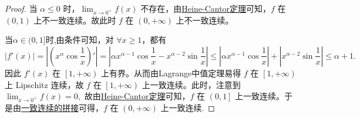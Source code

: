 \documentclass[../../main.tex]{subfiles}%
\begin{document}
\begin{proof}
当 $\alpha \leqslant 0$ 时，$\lim_{x \rightarrow 0^+} f\left( x \right)$ 不存在，由\hyperref[theroem:Heine-Cantor定理]{Heine-Cantor定理}可知，$f$ 在 $\left( 0,1 \right)$ 上不一致连续。故此时 $f$ 在 $\left( 0,+\infty \right)$ 上不一致连续。

当$\alpha \in (0,1]$时,由条件可知，对 $\forall x \geqslant 1$，都有
\[
\left| f'\left( x \right) \right| = \left| \left( x^{\alpha} \cos \frac{1}{x} \right)' \right| = \left| \alpha x^{\alpha - 1} \cos \frac{1}{x} - x^{\alpha - 2} \sin \frac{1}{x} \right| \leqslant \left| \alpha x^{\alpha - 1} \cos \frac{1}{x} \right| + \left| x^{\alpha - 2} \sin \frac{1}{x} \right| \leqslant \alpha + 1.
\]
因此 $f'\left( x \right)$ 在 $\left[ 1, +\infty \right)$ 上有界。从而由Lagrange中值定理易得 $f$ 在 $\left[ 1,+\infty \right)$ 上 Lipschitz 连续，故 $f$ 在 $\left[ 1,+\infty \right)$ 上一致连续。此时，注意到
\(
\lim_{x \rightarrow 0^+} f\left( x \right) = 0,
\)
故由\hyperref[theroem:Heine-Cantor定理]{Heine-Cantor定理}可知，$f$ 在 $\left( 0,1 \right]$ 上一致连续。于是由\hyperref[proposition:一致连续函数的拼接]{一致连续的拼接}可得，$f$ 在 $\left( 0,+\infty \right)$ 上一致连续.


\end{proof}
\end{document}
